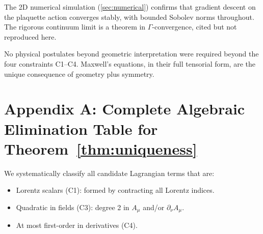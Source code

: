 \documentclass[12pt, a4paper]{article}
\theoremstyle{plain}
\theoremstyle{definition}
\theoremstyle{remark}
\begin{document}
The 2D numerical simulation (\cref{sec:numerical}) confirms that gradient descent on the plaquette action converges stably, with bounded Sobolev norms throughout.  The rigorous continuum limit is a theorem in $\Gamma$-convergence, cited but not reproduced here.

No physical postulates beyond geometric interpretation were required beyond the four constraints C1–C4.  Maxwell's equations, in their full tensorial form, are the unique consequence of geometry plus symmetry.

\appendix
\section{Appendix A: Complete Algebraic Elimination Table for Theorem~\ref{thm:uniqueness}}
\label{app:A}

We systematically classify all candidate Lagrangian terms that are:
\begin{itemize}
  \item Lorentz scalars (C1): formed by contracting all Lorentz indices.
  \item Quadratic in fields (C3): degree 2 in $A_\mu$ and/or $\partial_\nu A_\mu$.
  \item At most first-order in derivatives (C4).
\end{itemize}
\end{document}
